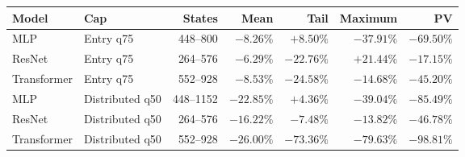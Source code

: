 \begin{tabular}{@{}llrrrrr@{}}
\toprule
Model & Cap & States & Mean & Tail & Maximum & PV \\
\midrule
MLP & Entry q75 & 448--800 & $-8.26\%$ & $+8.50\%$ & $-37.91\%$ & $-69.50\%$ \\
ResNet & Entry q75 & 264--576 & $-6.29\%$ & $-22.76\%$ & $+21.44\%$ & $-17.15\%$ \\
Transformer & Entry q75 & 552--928 & $-8.53\%$ & $-24.58\%$ & $-14.68\%$ & $-45.20\%$ \\
MLP & Distributed q50 & 448--1152 & $-22.85\%$ & $+4.36\%$ & $-39.04\%$ & $-85.49\%$ \\
ResNet & Distributed q50 & 264--576 & $-16.22\%$ & $-7.48\%$ & $-13.82\%$ & $-46.78\%$ \\
Transformer & Distributed q50 & 552--928 & $-26.00\%$ & $-73.36\%$ & $-79.63\%$ & $-98.81\%$ \\
\bottomrule
\end{tabular}
